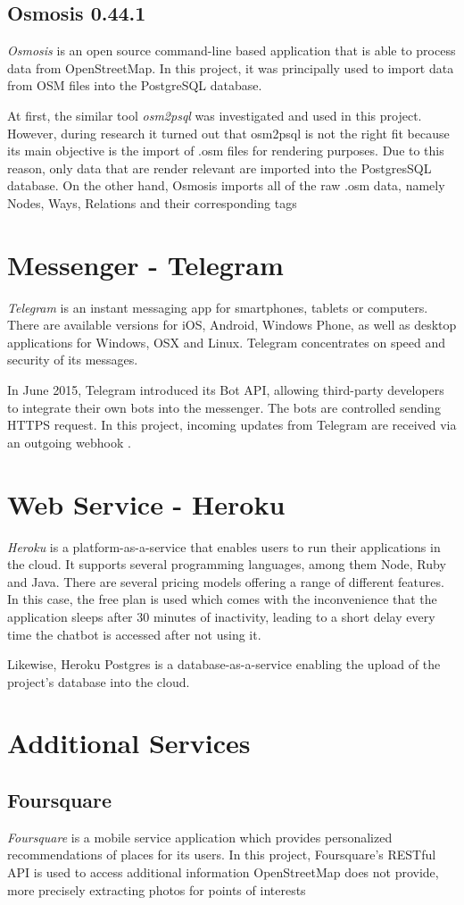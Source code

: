 \subsection{Osmosis 0.44.1}
\textit{Osmosis} \cite{osmosis} is an open source command-line based application that is able to process data from OpenStreetMap. In this project, it was principally used to import data from OSM files into the PostgreSQL database. 

At first, the similar tool \textit{osm2psql} was investigated and used in this project. However, during research it turned out that osm2psql is not the right fit because its main objective is the import of .osm files for rendering purposes. Due to this reason, only data that are render relevant are imported into the PostgresSQL database. On the other hand, Osmosis imports all of the raw .osm data, namely Nodes, Ways, Relations and their corresponding tags \cite{osmosis:osm2psql}

\section{Messenger - Telegram}
\textit{Telegram} \cite{telegram:faq} is an instant messaging app for smartphones, tablets or computers. There are available versions for iOS, Android, Windows Phone, as well as desktop applications for Windows, OSX and Linux. Telegram concentrates on speed and security of its messages. 

In June 2015, Telegram introduced its Bot API, allowing third-party developers to integrate their own bots into the messenger. The bots are controlled sending HTTPS request. In this project, incoming updates from Telegram are received via an outgoing webhook \cite{telegram:updates}.

\section{Web Service - Heroku}
\textit{Heroku} \cite{heroku} is a platform-as-a-service that enables users to run their applications in the cloud. It supports several programming languages, among them Node, Ruby and Java. There are several pricing models offering a range of different features. In this case, the free plan is used which comes with the inconvenience that the application sleeps after 30 minutes of inactivity, leading to a short delay every time the chatbot is accessed after not using it.

Likewise, Heroku Postgres is a database-as-a-service enabling the upload of the project’s database into the cloud. 

\section{Additional Services}
\subsection{Foursquare}
\textit{Foursquare} \cite{foursquare} is a mobile service application which provides personalized recommendations of places for its users. In this project, Foursquare’s RESTful API is used to access additional information OpenStreetMap does not provide, more precisely extracting photos for points of interests